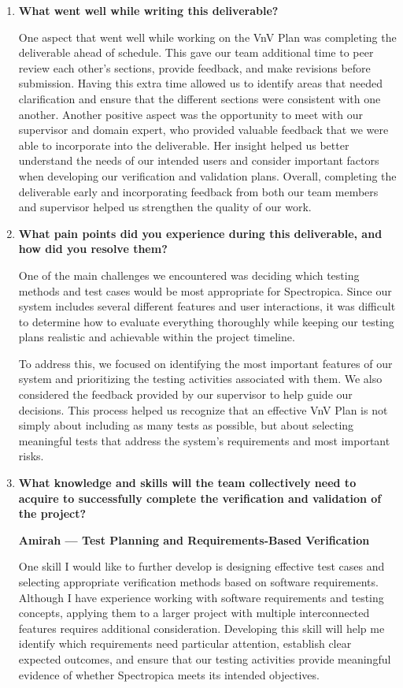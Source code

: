 \documentclass[12pt, titlepage]{article}
\newcounter{validation}
\begin{document}
\begin{enumerate}

\item \textbf{What went well while writing this deliverable?}

One aspect that went well while working on the VnV Plan was completing the
deliverable ahead of schedule. This gave our team additional time to peer review
each other's sections, provide feedback, and make revisions before submission.
Having this extra time allowed us to identify areas that needed clarification
and ensure that the different sections were consistent with one another. Another
positive aspect was the opportunity to meet with our supervisor and domain
expert, who provided valuable feedback that we were able to incorporate into the
deliverable. Her insight helped us better understand the needs of our intended
users and consider important factors when developing our verification and
validation plans. Overall, completing the deliverable early and incorporating
feedback from both our team members and supervisor helped us strengthen the
quality of our work.

\item \textbf{What pain points did you experience during this deliverable, and
how did you resolve them?}

One of the main challenges we encountered was deciding which testing methods and
test cases would be most appropriate for Spectropica. Since our system includes
several different features and user interactions, it was difficult to determine
how to evaluate everything thoroughly while keeping our testing plans realistic
and achievable within the project timeline.

To address this, we focused on identifying the most important features of our
system and prioritizing the testing activities associated with them. We also
considered the feedback provided by our supervisor to help guide our decisions.
This process helped us recognize that an effective VnV Plan is not simply about
including as many tests as possible, but about selecting meaningful tests that
address the system's requirements and most important risks.

\item \textbf{What knowledge and skills will the team collectively need to
acquire to successfully complete the verification and validation of the
project?}

\textbf{Amirah --- Test Planning and Requirements-Based Verification}

One skill I would like to further develop is designing effective test cases and
selecting appropriate verification methods based on software requirements.
Although I have experience working with software requirements and testing
concepts, applying them to a larger project with multiple interconnected
features requires additional consideration. Developing this skill will help me
identify which requirements need particular attention, establish clear expected
outcomes, and ensure that our testing activities provide meaningful evidence of
whether Spectropica meets its intended objectives.


\end{enumerate}
\end{document}
